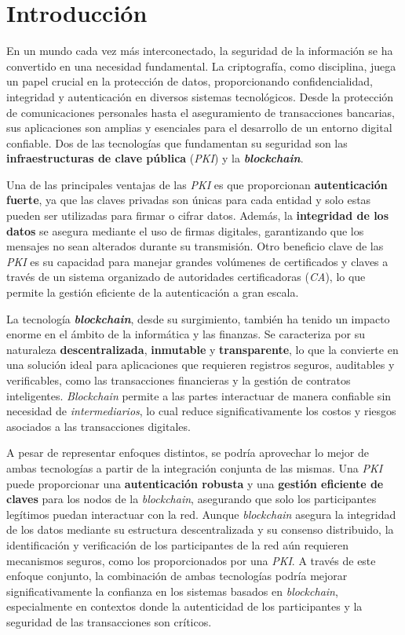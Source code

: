 \chapter*{Introducción}\label{chapter:introduction}

En un mundo cada vez más interconectado, la seguridad de la información se ha convertido en una necesidad fundamental. La criptografía, como disciplina, juega 
un papel crucial en la protección de datos, proporcionando confidencialidad, integridad y autenticación en diversos sistemas tecnológicos. Desde la 
protección de comunicaciones personales hasta el aseguramiento de transacciones bancarias, sus aplicaciones son amplias y esenciales para el desarrollo de un entorno 
digital confiable. Dos de las tecnologías que fundamentan su seguridad son las \textbf{infraestructuras de clave pública} (\textit{PKI}) y la \textbf{\textit{blockchain}}.

Una de las principales ventajas de las \textit{PKI} es que proporcionan \textbf{autenticación fuerte}, ya que las claves privadas son únicas para cada 
entidad y solo estas pueden ser utilizadas para firmar o cifrar datos. Además, la \textbf{integridad de los datos} se asegura mediante el uso de firmas 
digitales, garantizando que los mensajes no sean alterados durante su transmisión. Otro beneficio clave de las \textit{PKI} es su capacidad para manejar grandes volúmenes 
de certificados y claves a través de un sistema organizado de autoridades certificadoras (\textit{CA}), lo que permite la gestión eficiente de la autenticación a gran escala.

La tecnología \textbf{\textit{blockchain}}, desde su surgimiento, también ha tenido un impacto enorme en el ámbito de la informática y las finanzas. Se caracteriza por 
su naturaleza \textbf{descentralizada}, \textbf{inmutable} y \textbf{transparente}, lo que la convierte en una solución ideal para aplicaciones que requieren registros 
seguros, auditables y verificables, como las transacciones financieras y la gestión de contratos inteligentes. \textit{Blockchain} permite a las partes interactuar de manera confiable 
sin necesidad de \textit{intermediarios}, lo cual reduce significativamente los costos y riesgos asociados a las transacciones digitales.

A pesar de representar enfoques distintos, se podría aprovechar lo mejor de ambas tecnologías a partir de la integración conjunta de las mismas. Una \textit{PKI} puede proporcionar una \textbf{autenticación robusta} 
y una \textbf{gestión eficiente de claves} para los nodos de la \textit{blockchain}, asegurando que solo los participantes legítimos puedan interactuar con la red. Aunque \textit{blockchain} asegura la integridad de los datos mediante su estructura 
descentralizada y su consenso distribuido, la identificación y verificación de los participantes de la red aún requieren mecanismos seguros, como los proporcionados por una \textit{PKI}. A través de este enfoque conjunto, la combinación de 
ambas tecnologías podría mejorar significativamente la confianza en los sistemas basados en \textit{blockchain}, especialmente en contextos donde la autenticidad de los participantes y la seguridad de las transacciones son críticos.


